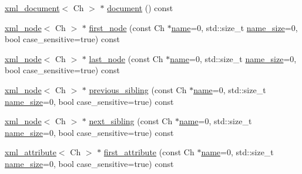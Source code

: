 \begin{DoxyCompactItemize}
\item 
\mbox{\hyperlink{classrapidxml_1_1xml__document}{xml\+\_\+document}}$<$ Ch $>$ $\ast$ \mbox{\hyperlink{classrapidxml_1_1xml__node_af23d2d56182411e9261ca6974bfd767f}{document}} () const
\item 
\mbox{\hyperlink{classrapidxml_1_1xml__node}{xml\+\_\+node}}$<$ Ch $>$ $\ast$ \mbox{\hyperlink{classrapidxml_1_1xml__node_acdf3691224d683f50692616a92a75d3f}{first\+\_\+node}} (const Ch $\ast$\mbox{\hyperlink{classrapidxml_1_1xml__base_aef8ae147fbee59209f714274afc80dc4}{name}}=0, std\+::size\+\_\+t \mbox{\hyperlink{classrapidxml_1_1xml__base_a20c8ffbe0c7a0b4231681ab8b99330a4}{name\+\_\+size}}=0, bool case\+\_\+sensitive=true) const
\item 
\mbox{\hyperlink{classrapidxml_1_1xml__node}{xml\+\_\+node}}$<$ Ch $>$ $\ast$ \mbox{\hyperlink{classrapidxml_1_1xml__node_a524d427e32c72fba9de1857e02e82fa7}{last\+\_\+node}} (const Ch $\ast$\mbox{\hyperlink{classrapidxml_1_1xml__base_aef8ae147fbee59209f714274afc80dc4}{name}}=0, std\+::size\+\_\+t \mbox{\hyperlink{classrapidxml_1_1xml__base_a20c8ffbe0c7a0b4231681ab8b99330a4}{name\+\_\+size}}=0, bool case\+\_\+sensitive=true) const
\item 
\mbox{\hyperlink{classrapidxml_1_1xml__node}{xml\+\_\+node}}$<$ Ch $>$ $\ast$ \mbox{\hyperlink{classrapidxml_1_1xml__node_aebcc42042ded78fb7020e2783f7d5426}{previous\+\_\+sibling}} (const Ch $\ast$\mbox{\hyperlink{classrapidxml_1_1xml__base_aef8ae147fbee59209f714274afc80dc4}{name}}=0, std\+::size\+\_\+t \mbox{\hyperlink{classrapidxml_1_1xml__base_a20c8ffbe0c7a0b4231681ab8b99330a4}{name\+\_\+size}}=0, bool case\+\_\+sensitive=true) const
\item 
\mbox{\hyperlink{classrapidxml_1_1xml__node}{xml\+\_\+node}}$<$ Ch $>$ $\ast$ \mbox{\hyperlink{classrapidxml_1_1xml__node_ad36aa4445ced578f93c3e06770cb3ef9}{next\+\_\+sibling}} (const Ch $\ast$\mbox{\hyperlink{classrapidxml_1_1xml__base_aef8ae147fbee59209f714274afc80dc4}{name}}=0, std\+::size\+\_\+t \mbox{\hyperlink{classrapidxml_1_1xml__base_a20c8ffbe0c7a0b4231681ab8b99330a4}{name\+\_\+size}}=0, bool case\+\_\+sensitive=true) const
\item 
\mbox{\hyperlink{classrapidxml_1_1xml__attribute}{xml\+\_\+attribute}}$<$ Ch $>$ $\ast$ \mbox{\hyperlink{classrapidxml_1_1xml__node_ab816ab6f13ee4b0588d5b76b0697511c}{first\+\_\+attribute}} (const Ch $\ast$\mbox{\hyperlink{classrapidxml_1_1xml__base_aef8ae147fbee59209f714274afc80dc4}{name}}=0, std\+::size\+\_\+t \mbox{\hyperlink{classrapidxml_1_1xml__base_a20c8ffbe0c7a0b4231681ab8b99330a4}{name\+\_\+size}}=0, bool case\+\_\+sensitive=true) const

\end{DoxyCompactItemize}
